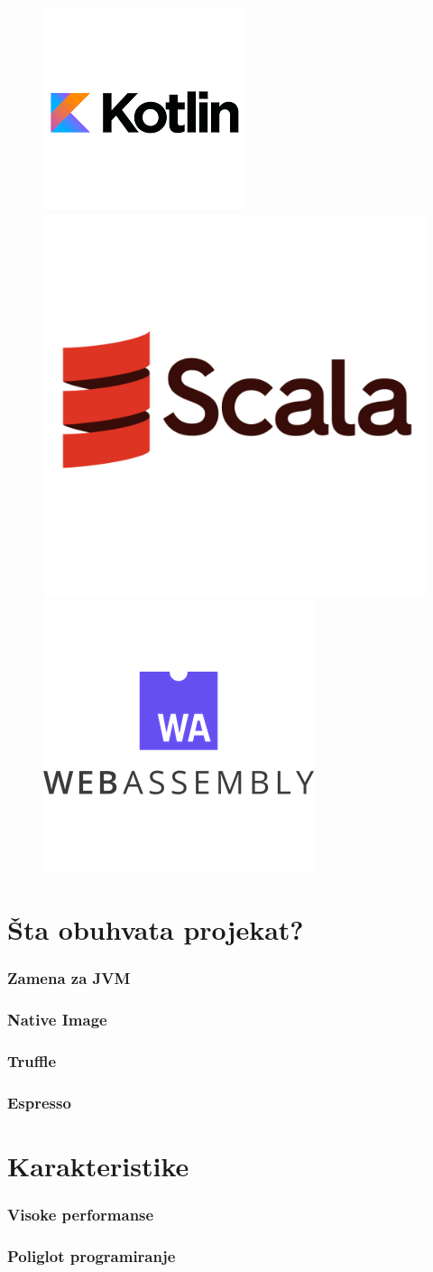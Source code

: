 \documentclass{beamer}
\begin{document}
\begin{frame}
\begin{figure}
			\includegraphics[width=0.16\linewidth]{imgs/kotlin_logo.png}
			\includegraphics[width=0.16\linewidth]{imgs/scala_logo.png}
			\includegraphics[width=0.16\linewidth]{imgs/wa_logo.png}
		\end{figure}
	\end{frame}	
	

	\section{Šta obuhvata projekat?}
	
	\begin{frame}
		\frametitle{Zamena za JVM}
	\end{frame}	
	
	\begin{frame}
		\frametitle{Native Image}
	\end{frame}	
	
	
	\begin{frame}
		\frametitle{Truffle}
	\end{frame}	

	\begin{frame}
		\frametitle{Espresso}
	\end{frame}	
	
		
	\section{Karakteristike}
	
	\begin{frame}
		\frametitle{Visoke performanse}
	\end{frame}	

	\begin{frame}
		\frametitle{Poliglot programiranje}
	\end{frame}	
\end{document}
